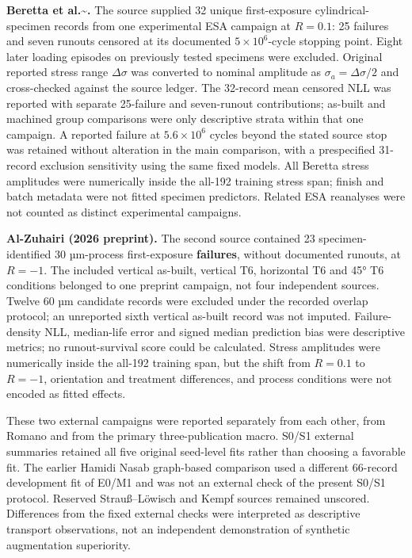 \documentclass[12pt,a4paper]{article}
\begin{document}
\textbf{Beretta et al.\textasciitilde{}\cite{beretta2022}.} The source supplied 32 unique first-exposure cylindrical-specimen records from one experimental ESA campaign at \(R=0.1\): 25 failures and seven runouts censored at its documented \(5\times10^6\)-cycle stopping point. Eight later loading episodes on previously tested specimens were excluded. Original reported stress range \(\Delta\sigma\) was converted to nominal amplitude as \(\sigma_a=\Delta\sigma/2\) and cross-checked against the source ledger. The 32-record mean censored NLL was reported with separate 25-failure and seven-runout contributions; as-built and machined group comparisons were only descriptive strata within that one campaign. A reported failure at \(5.6\times10^6\) cycles beyond the stated source stop was retained without alteration in the main comparison, with a prespecified 31-record exclusion sensitivity using the same fixed models. All Beretta stress amplitudes were numerically inside the all-192 training stress span; finish and batch metadata were not fitted specimen predictors. Related ESA reanalyses were not counted as distinct experimental campaigns.

\textbf{Al-Zuhairi (2026 preprint).} The second source contained 23 specimen-identified 30 µm-process first-exposure \textbf{failures}, without documented runouts, at \(R=-1\). The included vertical as-built, vertical T6, horizontal T6 and 45° T6 conditions belonged to one preprint campaign, not four independent sources. Twelve 60 µm candidate records were excluded under the recorded overlap protocol; an unreported sixth vertical as-built record was not imputed. Failure-density NLL, median-life error and signed median prediction bias were descriptive metrics; no runout-survival score could be calculated. Stress amplitudes were numerically inside the all-192 training span, but the shift from \(R=0.1\) to \(R=-1\), orientation and treatment differences, and process conditions were not encoded as fitted effects.

These two external campaigns were reported separately from each other, from Romano and from the primary three-publication macro. S0/S1 external summaries retained all five original seed-level fits rather than choosing a favorable fit. The earlier Hamidi Nasab graph-based comparison used a different 66-record development fit of E0/M1 and was not an external check of the present S0/S1 protocol. Reserved Strauß–Löwisch and Kempf sources remained unscored. Differences from the fixed external checks were interpreted as descriptive transport observations, not an independent demonstration of synthetic augmentation superiority.
\end{document}
